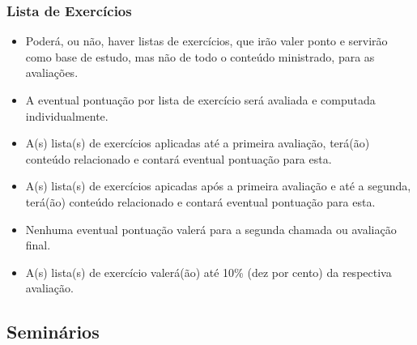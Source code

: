 \begin{frame}[t]\frametitle{Lista de Exercícios}

  \begin{itemize}
    \justifying{}
    \setlength\itemsep{1em}
    \item Poderá, ou não, haver listas de exercícios, que irão valer ponto e servirão como base de estudo, mas não de todo o conteúdo ministrado, para as avaliações.
    \item A eventual pontuação por lista de exercício será avaliada e computada individualmente.
    \item A(s) lista(s) de exercícios aplicadas até a primeira avaliação, terá(ão) conteúdo relacionado e contará eventual pontuação para esta.
    \item A(s) lista(s) de exercícios apicadas após a primeira avaliação e até a segunda, terá(ão) conteúdo relacionado e contará eventual pontuação para esta.
    \item Nenhuma eventual pontuação valerá para a segunda chamada ou avaliação final.
    \item A(s) lista(s) de exercício valerá(ão) até 10\% (dez por cento) da respectiva avaliação.
  \end{itemize}

\end{frame}



\subsection[Seminários]{Seminários}\label{subsec:planejamento-seminarios}



